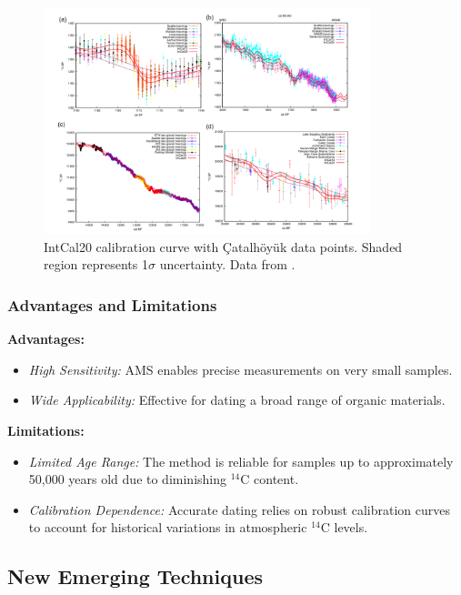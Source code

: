 \documentclass{article}
\begin{document}
\begin{figure}[htbp]
    \centering
    \includegraphics[width=0.85\textwidth]{c14_calibration.png}
    \caption{IntCal20 calibration curve with Çatalhöyük data points. Shaded region represents 1\(\sigma\) uncertainty. Data from \cite{Reimer2020}.}
    \label{fig:c14_cal}
\end{figure}

\subsubsection*{Advantages and Limitations}
\textbf{Advantages:}
\begin{itemize}
    \item \emph{High Sensitivity:} AMS enables precise measurements on very small samples.
    \item \emph{Wide Applicability:} Effective for dating a broad range of organic materials.
\end{itemize}

\textbf{Limitations:}
\begin{itemize}
    \item \emph{Limited Age Range:} The method is reliable for samples up to approximately 50,000 years old due to diminishing \(^{14}\text{C}\) content.
    \item \emph{Calibration Dependence:} Accurate dating relies on robust calibration curves to account for historical variations in atmospheric \(^{14}\text{C}\) levels.
\end{itemize}

\subsection{New Emerging Techniques}
\end{document}
